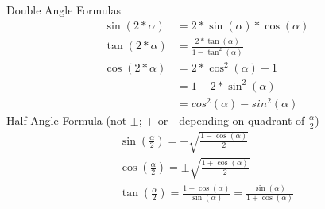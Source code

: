 \documentclass{article}
\renewcommand{\a}{\alpha}
\begin{document}
	Double Angle Formulas
	\begin{align*}
		\sin(2 * \a) &= 2 * \sin(\a) * \cos(\a) \\
		\tan(2 * \a) &= \frac{ 2 * \tan(\a)}{1 - \tan^2(\a)} \\
		\cos(2 * \a) &= 2 * \cos^2(\a) - 1 \\
		&= 1 - 2 * \sin^2(\a) \\
		&= cos^2(\a) - sin^2(\a)
	\end{align*}
	Half Angle Formula (not $\pm$; + or - depending on quadrant of $\frac{\alpha}{2}$)
	\begin{align*}
		\sin(\frac{\a}{2}) = \pm \sqrt{ \frac{1 - \cos(\a)}{2} } \\
		\cos(\frac{\a}{2}) = \pm \sqrt{ \frac{1 + \cos(\a)}{2} } \\
		\tan(\frac{\a}{2}) = \frac{1 - \cos(\a)}{\sin(\a)} = \frac{\sin(\a)}{1 + \cos(\a)}
	\end{align*}
\end{document}
